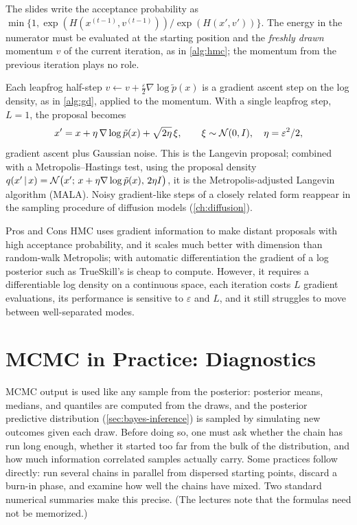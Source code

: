 \begin{remark}
The slides write the acceptance probability as $\min\{1,\exp(H(x^{(t-1)},v^{(t-1)}))/\exp(H(x',v'))\}$. The energy in the numerator must be evaluated at the starting position and the \emph{freshly drawn} momentum $v$ of the current iteration, as in \cref{alg:hmc}; the momentum from the previous iteration plays no role.
\end{remark}

\begin{remark}
Each leapfrog half-step $v\gets v+\frac\varepsilon2\nabla\log\tilde p(x)$ is a gradient ascent step on the log density, as in \cref{alg:gd}, applied to the momentum. With a single leapfrog step, $L=1$, the proposal becomes
\[
x'=x+\eta\,\nabla\log\tilde p(x)+\sqrt{2\eta}\,\xi,\qquad\xi\sim\mathcal{N}(0,I),\quad\eta=\varepsilon^2/2,
\]
gradient ascent plus Gaussian noise. This is the Langevin proposal; combined with a Metropolis--Hastings test, using the proposal density $q(x'\,|\, x)=\mathcal{N}\big(x';\,x+\eta\nabla\log\tilde p(x),\,2\eta I\big)$, it is the Metropolis-adjusted Langevin algorithm (MALA). Noisy gradient-like steps of a closely related form reappear in the sampling procedure of diffusion models (\cref{ch:diffusion}).
\end{remark}

\begin{notebox}{Pros and Cons}
HMC uses gradient information to make distant proposals with high acceptance probability, and it scales much better with dimension than random-walk Metropolis; with automatic differentiation the gradient of a log posterior such as TrueSkill's is cheap to compute. However, it requires a differentiable log density on a continuous space, each iteration costs $L$ gradient evaluations, its performance is sensitive to $\varepsilon$ and $L$, and it still struggles to move between well-separated modes.
\end{notebox}

\section{MCMC in Practice: Diagnostics}\label{sec:mcmc-diagnostics}

MCMC output is used like any sample from the posterior: posterior means, medians, and quantiles are computed from the draws, and the posterior predictive distribution (\cref{sec:bayes-inference}) is sampled by simulating new outcomes given each draw. Before doing so, one must ask whether the chain has run long enough, whether it started too far from the bulk of the distribution, and how much information correlated samples actually carry. Some practices follow directly: run several chains in parallel from dispersed starting points, discard a burn-in phase, and examine how well the chains have mixed. Two standard numerical summaries make this precise. (The lectures note that the formulas need not be memorized.)

